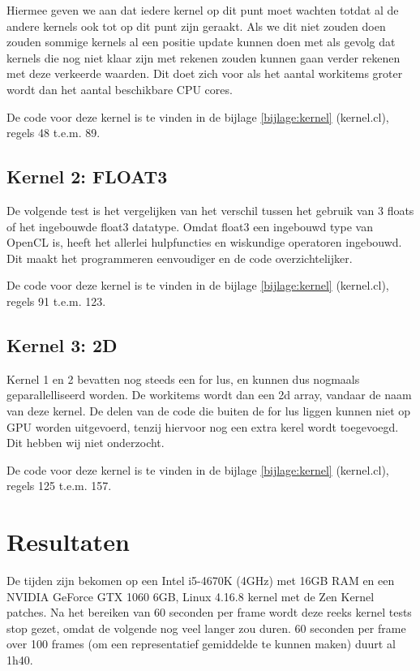 \documentclass[a4paper]{article}
\begin{document}
Hiermee geven we aan dat iedere kernel op dit punt moet wachten totdat al de andere kernels ook tot op dit punt zijn geraakt. Als we dit niet zouden doen zouden sommige kernels al een positie update kunnen doen met als gevolg dat kernels die nog niet klaar zijn met rekenen zouden kunnen gaan verder rekenen met deze verkeerde waarden. Dit doet zich voor als het aantal workitems groter wordt dan het aantal beschikbare CPU cores.

De code voor deze kernel is te vinden in de bijlage \ref{bijlage:kernel} (kernel.cl), regels 48 t.e.m. 89.

\subsection{Kernel 2: FLOAT3}

De volgende test is het vergelijken van het verschil tussen het gebruik van 3 floats of het ingebouwde float3 datatype.
Omdat float3 een ingebouwd type van OpenCL is, heeft het allerlei hulpfuncties en wiskundige operatoren ingebouwd. Dit maakt het programmeren eenvoudiger en de code overzichtelijker.

De code voor deze kernel is te vinden in de bijlage \ref{bijlage:kernel} (kernel.cl), regels 91 t.e.m. 123.

\subsection{Kernel 3: 2D}

Kernel 1 en 2 bevatten nog steeds een for lus, en kunnen dus nogmaals geparallelliseerd worden. De workitems wordt dan een 2d array, vandaar de naam van deze kernel.
De delen van de code die buiten de for lus liggen kunnen niet op GPU worden uitgevoerd, tenzij hiervoor nog een extra kerel wordt toegevoegd. Dit hebben wij niet onderzocht.

De code voor deze kernel is te vinden in de bijlage \ref{bijlage:kernel} (kernel.cl), regels 125 t.e.m. 157.

\section{Resultaten}\label{section:resultaten}

De tijden zijn bekomen op een Intel i5-4670K (4GHz) met 16GB RAM en een NVIDIA GeForce GTX 1060 6GB, Linux 4.16.8 kernel met de Zen Kernel patches.
Na het bereiken van 60 seconden per frame wordt deze reeks kernel tests stop gezet, omdat de volgende nog veel langer zou duren. 60 seconden per frame over 100 frames (om een representatief gemiddelde te kunnen maken) duurt al 1h40.
\end{document}
